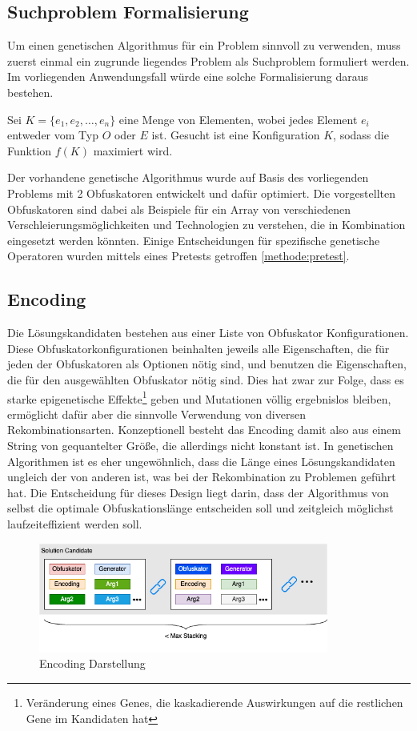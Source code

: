 \subsection{Suchproblem Formalisierung}
Um einen genetischen Algorithmus für ein Problem sinnvoll zu verwenden, muss zuerst einmal ein zugrunde liegendes Problem als Suchproblem formuliert werden. Im vorliegenden Anwendungsfall würde eine solche Formalisierung daraus bestehen.
    

Sei $K = \{e_1, e_2, \ldots, e_n\}$ eine Menge von Elementen, wobei jedes Element $e_i$ entweder vom Typ $O$ oder $E$ ist. Gesucht ist eine Konfiguration $K$, sodass die Funktion $f(K)$ maximiert wird.

Der vorhandene genetische Algorithmus wurde auf Basis des vorliegenden Problems mit 2 Obfuskatoren entwickelt und dafür optimiert. Die vorgestellten Obfuskatoren sind dabei als Beispiele für ein Array von verschiedenen Verschleierungsmöglichkeiten und Technologien zu verstehen, die in Kombination eingesetzt werden könnten. Einige Entscheidungen für spezifische genetische Operatoren wurden mittels eines Pretests getroffen \ref{methode:pretest}.

\subsection{Encoding}
Die Lösungskandidaten bestehen aus einer Liste von Obfuskator Konfigurationen. Diese Obfuskatorkonfigurationen beinhalten jeweils alle Eigenschaften, die für jeden der Obfuskatoren als Optionen nötig sind, und benutzen die Eigenschaften, die für den ausgewählten Obfuskator nötig sind. Dies hat zwar zur Folge, dass es starke epigenetische Effekte\footnote{Veränderung eines Genes, die kaskadierende Auswirkungen auf die restlichen Gene im Kandidaten hat} geben und Mutationen völlig ergebnislos bleiben, ermöglicht dafür aber die sinnvolle Verwendung von diversen Rekombinationsarten. Konzeptionell besteht das Encoding damit also aus einem String von gequantelter Größe, die allerdings nicht konstant ist. 
In genetischen Algorithmen ist es eher ungewöhnlich, dass die Länge eines Lösungskandidaten ungleich der von anderen ist, was bei der Rekombination zu Problemen geführt hat. Die Entscheidung für dieses Design liegt darin, dass der Algorithmus von selbst die optimale Obfuskationslänge entscheiden soll und zeitgleich möglichst laufzeiteffizient werden soll.
\begin{figure}[h]
    \centering
    \includegraphics[width=0.85\textwidth]{gfx/Abbildungen/Encoding Diagram.png}
    \caption{Encoding Darstellung}
    \label{fig:encoding}
\end{figure}

